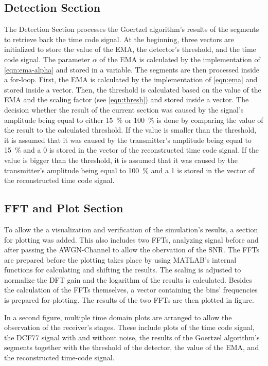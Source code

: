 \documentclass[conference]{IEEEtran}
\begin{document}
\subsection{Detection Section}
The Detection Section processes the Goertzel algorithm's results of the segments to retrieve back the time code signal.
At the beginning, three vectors are initialized to store the value of the EMA, the detector's threshold, and the time code signal.
The parameter $\alpha$ of the EMA is calculated by the implementation of \eqref{eqn:ema-alpha} and stored in a variable.
The segments are then processed inside a for-loop.
First, the EMA is calculated by the implementation of \eqref{eqn:ema} and stored inside a vector.
Then, the threshold is calculated based on the value of the EMA and the scaling factor (see \eqref{eqn:thresh}) and stored inside a vector.
The decision whether the result of the current section was caused by the signal's amplitude being equal to either \SI{15}{\percent} or
\SI{100}{\percent} is done by comparing the value of the result to the calculated threshold.
If the value is smaller than the threshold, it is assumed that it was caused by the transmitter's amplitude being equal to \SI{15}{\percent} and
a 0 is stored in the vector of the reconstructed time code signal.
If the value is bigger than the threshold, it is assumed that it was caused by the transmitter's amplitude being equal to \SI{100}{\percent} and a 1 is stored in the vector of the reconstructed time code signal.

\subsection{FFT and Plot Section}
To allow the a visualization and verification of the simulation's results, a section for plotting was added.
This also includes two FFTs, analyzing signal before and after passing the AWGN-Channel to allow the obervation of the SNR.
The FFTs are prepared before the plotting takes place by using MATLAB's internal functions for calculating and shifting the results.
The scaling is adjusted to normalize the DFT gain and the logarithm of the results is calculated.
Besides the calculation of the FFTs themselves, a vector containing the bins' frequencies is prepared for plotting.
The results of the two FFTs are then plotted in figure.
\par
In a second figure, multiple time domain plots are arranged to allow the observation of the receiver's stages.
These include plots of the time code signal, the DCF77 signal with and without noise, the results of the Goertzel algorithm's segments together with the threshold of the detector, the value of the EMA, and the reconstructed time-code signal.
\end{document}

